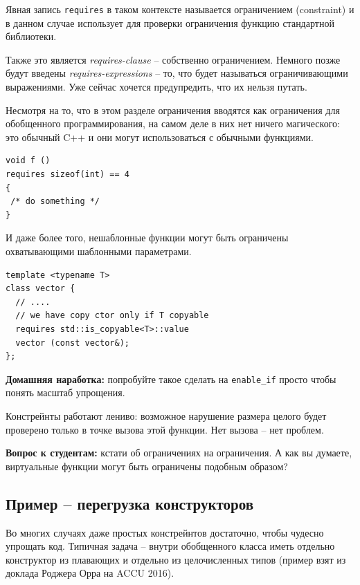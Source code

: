 \documentclass[a4paper,12pt,oneside]{book}
\newif\ifanswers
\begin{document}
Явная запись \lstinline!requires! в таком контексте называется ограничением (constraint) и в данном случае использует для проверки ограничения функцию стандартной библиотеки.

Также это является \textit{requires-clause} -- собственно ограничением. Немного позже будут введены \textit{requires-expressions} -- то, что будет называться ограничивающими выражениями. Уже сейчас хочется предупредить, что их нельзя путать.

Несмотря на то, что в этом разделе ограничения вводятся как ограничения для обобщенного программирования, на самом деле в них нет ничего магического: это обычный C++ и они могут использоваться с обычными функциями.

\begin{lstlisting}
void f ()
requires sizeof(int) == 4
{
 /* do something */
}
\end{lstlisting}

И даже более того, нешаблонные функции могут быть ограничены охватывающими шаблонными параметрами.

\begin{lstlisting}
template <typename T>
class vector {
  // ....
  // we have copy ctor only if T copyable
  requires std::is_copyable<T>::value
  vector (const vector&);
};
\end{lstlisting}

\textbf{Домашняя наработка:} попробуйте такое сделать на \lstinline!enable_if! просто чтобы понять масштаб упрощения.

Констрейнты работают лениво: возможное нарушение размера целого будет проверено только в точке вызова этой функции. Нет вызова -- нет проблем.

\textbf{Вопрос к студентам:} кстати об ограничениях на ограничения. А как вы думаете, виртуальные функции могут быть ограничены подобным образом?

\ifanswers
Правильный ответ: конечно не могут (примерно по тем же причинам, по каким они не могут быть шаблонными). В таблице виртуальных функций просто нет места для этого признака, а связывать его со статическим типом чревато проблемами.
\fi

\subsection{Пример -- перегрузка конструкторов}

Во многих случаях даже простых констрейнтов достаточно, чтобы чудесно упрощать код. Типичная задача -- внутри обобщенного класса иметь отдельно конструктор из плавающих и отдельно из целочисленных типов (пример взят из доклада Роджера Орра на ACCU 2016). 
\end{document}
